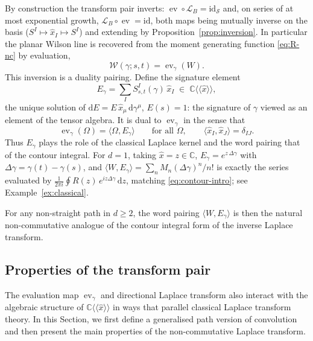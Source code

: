 \documentclass[11pt,a4paper]{article}
\DeclareMathOperator{\ev}{ev}
\newcommand{\xh}{\hat{x}}
\newcommand{\cW}{\mathcal{W}}
\newcommand{\cL}{\mathcal{L}}
\newcommand{\dd}{\mathrm{d}}
\begin{document}
By construction the transform pair inverts: $\ev\circ\cL_B=\mathrm{id}_{\mathcal S}$ and, on series of at most exponential growth, $\cL_B\circ\ev=\mathrm{id}$, both maps being mutually inverse on the basis ($S^I\mapsto\xh_I\mapsto S^I$) and extending by Proposition~\ref{prop:inversion}. In particular the planar Wilson line is recovered from the moment generating function \eqref{eq:R-nc} by evaluation,
\begin{equation}\label{eq:inverse}
  \cW(\gamma;s,t)=\ev_\gamma(W).
\end{equation}
This inversion is a duality pairing. Define the signature element
\begin{equation}\label{eq:E-gamma}
  E_\gamma = \sum_{I}S^{I}_{s,t}(\gamma)\,\xh_I \;\in\;\mathbb{C}\langle\langle\xh\rangle\rangle,
\end{equation}
the unique solution of $\dd E = E\,\xh_\mu\,\dd\gamma^\mu$, $E(s)=1$: the
signature of $\gamma$ viewed as an element of the tensor algebra. It is
dual to $\ev_\gamma$ in the sense that
\begin{equation}\label{eq:pairing}
  \ev_\gamma(\Omega) = \langle \Omega, E_\gamma\rangle
  \qquad\text{for all }\Omega,
  \qquad \langle\xh_I,\xh_J\rangle = \delta_{IJ}.
\end{equation}
Thus $E_\gamma$ plays the role of the classical Laplace kernel and the word
pairing that of the contour integral.
For $d=1$, taking $\xh=z\in\mathbb{C}$, $E_\gamma = e^{z\,\Delta\gamma}$ with $\Delta\gamma=\gamma(t)-\gamma(s)$, and $\langle W,E_\gamma\rangle=\sum_n M_n(\Delta\gamma)^n/n!$ is exactly the series evaluated by $\frac{1}{2\pi i}\oint R(z)\,e^{iz\Delta\gamma}\,\dd z$, matching \eqref{eq:contour-intro}; see Example~\ref{ex:classical}.

For any non-straight path in $d\geq 2$, the word pairing $\langle W,E_\gamma\rangle$ is then the natural non-commutative analogue of the contour integral form of the inverse Laplace transform.


\subsection{Properties of the transform pair}\label{sec:props}

The evaluation map $\ev_\gamma$ and directional Laplace transform also interact with the algebraic structure of $\mathbb{C}\langle\langle\xh\rangle\rangle$ in ways that parallel classical Laplace transform theory. In this Section, we first define a generalised path version of convolution and then present the main properties of the non-commutative Laplace transform.
\end{document}
